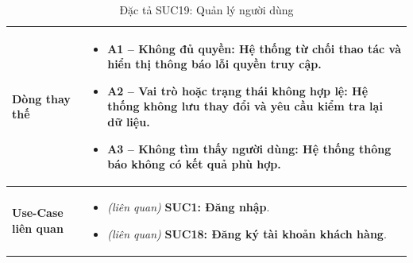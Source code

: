 \begin{table}[H]
\begin{tabularx}{\textwidth}{|>{\centering\arraybackslash\bfseries}m{3.5cm}|X|}
    \hline
    Dòng thay thế &
    \begin{itemize}[leftmargin=*, nosep, label=-]
        \vspace{0.1cm}
        \item \textbf{A1 -- Không đủ quyền:} Hệ thống từ chối thao tác và hiển thị thông báo lỗi quyền truy cập.
        \item \textbf{A2 -- Vai trò hoặc trạng thái không hợp lệ:} Hệ thống không lưu thay đổi và yêu cầu kiểm tra lại dữ liệu.
        \item \textbf{A3 -- Không tìm thấy người dùng:} Hệ thống thông báo không có kết quả phù hợp.
    \end{itemize} \\
    \hline
    Use-Case liên quan &
    \begin{itemize}[leftmargin=*, nosep, label=-]
        \vspace{0.1cm}
        \item \textit{(liên quan)} \textbf{SUC1: Đăng nhập}.
        \item \textit{(liên quan)} \textbf{SUC18: Đăng ký tài khoản khách hàng}.
\end{itemize} \\
    \hline
\end{tabularx}
\caption{Đặc tả SUC19: Quản lý người dùng}
\end{table}


\vspace{1cm}

